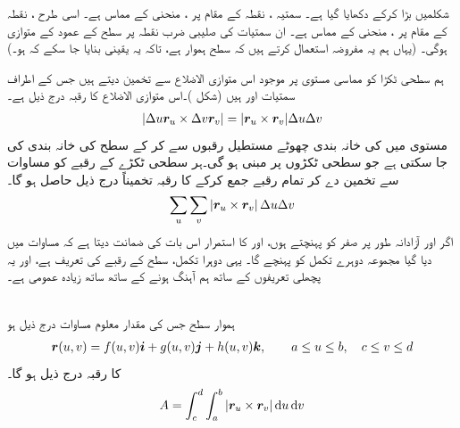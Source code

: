 شکلمیں  بڑا کرکے دکھایا گیا ہے۔ 
سمتیہ ، نقطہ  کے مقام  پر  ، منحنی   کے مماس ہے۔ 
اسی طرح   ، نقطہ  کے مقام پر ، منحنی  کے  مماس ہے۔ ان  سمتیات کی صلیبی  ضرب نقطہ  پر سطح کے عمود کے  متوازی ہوگی۔ (یہاں ہم یہ مفروضہ استعمال کرتے ہیں کہ سطح  ہموار ہے، تاکہ یہ یقینی بنایا جا سکے کہ ہو۔)

 ہم سطحی  ٹکڑا  کو مماسی مستوی  پر موجود اس متوازی الاضلاع سے تخمین دیتے  ہیں جس کے اطراف  سمتیات  اور ہیں (شکل )۔اس متوازی الاضلاع کا رقبہ  درج ذیل ہے۔
\begin{align}\label{مساوات_مقدار_معلوم_ب}
|\Delta u{{\boldsymbol{r}}}_u \times \Delta v{{\boldsymbol{r}}}_v|=|{{\boldsymbol{r}}}_u \times {\ensuremath{{\boldsymbol{r}}}}_v|\Delta u\Delta v
\end{align}
مستوی  میں    کی خانہ بندی   چھوٹے مستطیل  رقبوں   سے کر کے سطح   کی خانہ بندی  کی جا سکتی ہے جو  سطحی  ٹکڑوں پر مبنی ہو گی۔ہر سطحی  ٹکڑے    کے رقبے کو  مساوات  سے تخمین دے کر   تمام رقبے   جمع کرکے   کا رقبہ  تخمیناً   درج ذیل حاصل ہو گا۔
\begin{align}\label{مساوات_مقدار_معلوم_پ}
\sum_u \sum_v\left|{{\boldsymbol{r}}}_u \times {\ensuremath{{\boldsymbol{r}}}}_v\right|\Delta u\Delta v
\end{align}
اگر   اور  آزادانہ طور پر صفر کو پہنچتے ہوں،   اور  کا استمرار  اس بات کی ضمانت دیتا ہے کہ  مساوات  میں دیا گیا مجموعہ دوہرے تکمل  کو پہنچے گا۔ یہی   دوہرا تکمل،   سطح  کے رقبے کی تعریف ہے، اور یہ پچھلی تعریفوں کے ساتھ ہم آہنگ ہونے کے ساتھ ساتھ  زیادہ عمومی ہے۔


\\
 ہموار سطح جس کی مقدار معلوم مساوات درج ذیل ہو 
\begin{align*}
{\ensuremath{{\boldsymbol{r}}}}(u,v)=f(u,v){\boldsymbol{i}}+g(u,v){\boldsymbol{j}}+h(u,v){\boldsymbol{k}},\qquad   a\le u\le b,\quad c\le v\le d
\end{align*}
کا رقبہ درج ذیل ہو گا۔
\begin{align}\label{مساوات_مقدار_معلوم_ت}
A=\int_{c}^{d}\int_{a}^{b}|\kvec{r}_u \times \kvec{r}_v|\dif u\dif v
\end{align}

